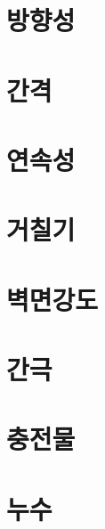 \documentclass[12pt, a4paper, oneside]{book}
\begin{document}
	\section{방향성}
	
	
	
	\clearpage
	\section{간격}
	
	
	\clearpage
	\section{연속성}
	
	
	
	
	\clearpage
	\section{거칠기}
	
	
	
	\clearpage
	\section{벽면강도}
	
	
	\clearpage
	\section{간극}
	
	
	
	
	\clearpage
	\section{충전물}
	
	
	\clearpage
	\section{누수}
	
	
	
	\clearpage
\end{document}

